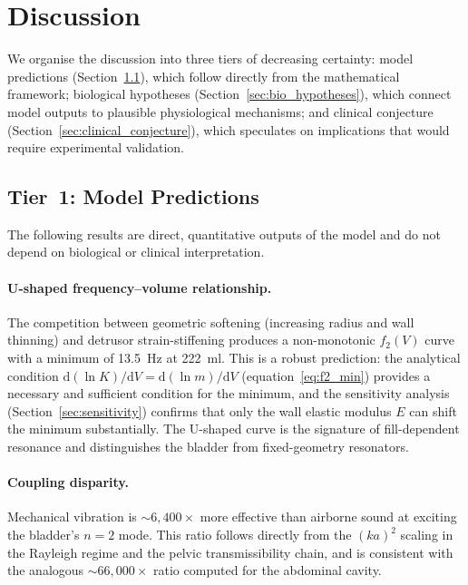 \section{Discussion}
\label{sec:discussion}

We organise the discussion into three tiers of decreasing certainty:
model predictions (Section~\ref{sec:model_predictions}), which follow
directly from the mathematical framework; biological hypotheses
(Section~\ref{sec:bio_hypotheses}), which connect model outputs to
plausible physiological mechanisms; and clinical conjecture
(Section~\ref{sec:clinical_conjecture}), which speculates on
implications that would require experimental validation.


\subsection{Tier~1: Model Predictions}
\label{sec:model_predictions}

The following results are direct, quantitative outputs of the model and
do not depend on biological or clinical interpretation.

\paragraph{U-shaped frequency--volume relationship.}
The competition between geometric softening (increasing radius and wall
thinning) and detrusor strain-stiffening produces a non-monotonic $f_2(V)$
curve with a minimum of \SI{13.5}{\hertz} at \SI{222}{\milli\litre}.  This
is a robust prediction: the analytical condition
$\mathrm{d}(\ln K)/\mathrm{d}V = \mathrm{d}(\ln m)/\mathrm{d}V$
(equation~\ref{eq:f2_min}) provides a necessary and sufficient condition for
the minimum, and the sensitivity analysis (Section~\ref{sec:sensitivity})
confirms that only the wall elastic modulus $E$ can shift the minimum
substantially.  The U-shaped curve is the signature of fill-dependent
resonance and distinguishes the bladder from fixed-geometry resonators.

\paragraph{Coupling disparity.}
Mechanical vibration is $\sim$$6{,}400\times$ more effective than airborne
sound at exciting the bladder's $n = 2$ mode.  This ratio follows directly
from the $(ka)^2$ scaling in the Rayleigh regime and the pelvic
transmissibility chain, and is consistent with the analogous
$\sim$$66{,}000\times$ ratio computed for the abdominal cavity.

